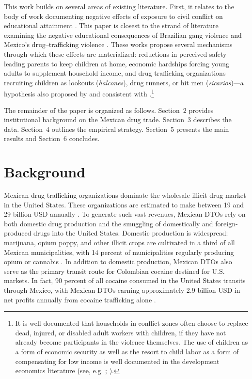 \documentclass[12pt,letter,english,intoc,bibliography=totoc,index=totoc,BCOR10mm,captions=tableheading,nottitlepage,fleqn]{article}
\theoremstyle{break}
\begin{document}
This work builds on several areas of existing literature. First, it relates to the body of work documenting negative effects of exposure to civil conflict on educational attainment \citep{leon2012, justino2013, ichino2004, shemayinka2011, akresh2008}. This paper is closest to the strand of literature examining the negative educational consequences of Brazilian gang violence and Mexico's drug--trafficking violence \citep{brown2017, jarillo2016, caudillo2014, michaelsen2020, padilla2015, orraca2018, montes2021,koppensteiner2021,monteiro2017}. These works propose several mechanisms through which these effects are materialized: reductions in perceived safety leading parents to keep children at home, economic hardships forcing young adults to supplement household income, and drug trafficking organizations recruiting children as lookouts (\textit{halcones}), drug runners, or hit men (\textit{sicarios})---a hypothesis also proposed by \citet{jarillo2016} and consistent with \citet{swee2015}.\footnote{It is well documented that households in conflict zones often choose to replace dead, injured, or disabled adult workers with children, if they have not already become participants in the violence themselves. The use of children as a form of economic security as well as the resort to child labor as a form of compensating for low income is well documented in the development economics literature (see, e.g. \citet{justino2012}; \citet{rodriguez2009}).} 

The remainder of the paper is organized as follows. Section~2 provides institutional background on the Mexican drug trade. Section~3 describes the data. Section~4 outlines the empirical strategy. Section~5 presents the main results and Section~6 concludes.

\section{Background}
Mexican drug trafficking organizations dominate the wholesale illicit drug market in the United States. These organizations are estimated to make between 19 and 29 billion USD annually \citep{guerrero2011}. To generate such vast revenues, Mexican DTOs rely on both domestic drug production and the smuggling of domestically and foreign-produced drugs into the United States. Domestic production is widespread: marijuana, opium poppy, and other illicit crops are cultivated in a third of all Mexican municipalities, with 14 percent of municipalities regularly producing opium or cannabis \citep{dube2016, dell2015}. In addition to domestic production, Mexican DTOs also serve as the primary transit route for Colombian cocaine destined for U.S. markets. In fact, 90 percent of all cocaine consumed in the United States transits through Mexico, with Mexican DTOs earning approximately 2.9 billion USD in net profits annually from cocaine trafficking alone \citep{unodc2010}.
\end{document}
